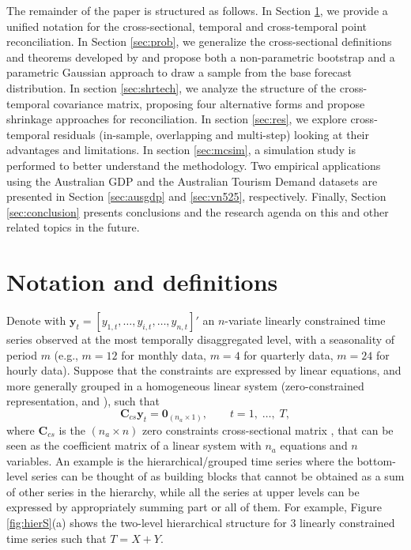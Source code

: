 \documentclass[a4paper,11pt]{article}
\newcommand{\yvet}{\bm{y}}
\newcommand{\Cvet}{\bm{C}}
\newcommand{\Zerovet}{\bm{0}}
\theoremstyle{definition}
\begin{document}
The remainder of the paper is structured as follows.
In Section \ref{sec:not}, we provide a unified notation for the cross-sectional, temporal and cross-temporal point reconciliation.
In Section \ref{sec:prob}, we generalize the cross-sectional definitions and theorems developed by \cite{panagiotelis2023} and propose both a non-parametric bootstrap and a parametric Gaussian approach to draw a sample from the base forecast distribution.
In section \ref{sec:shrtech}, we analyze the structure of the cross-temporal covariance matrix, proposing four alternative forms and propose shrinkage approaches for reconciliation.
In section \ref{sec:res}, we explore cross-temporal residuals (in-sample, overlapping and multi-step) looking at their advantages and limitations.
In section \ref{sec:mcsim}, a simulation study is performed to better understand the methodology.
Two empirical applications using the Australian GDP and the Australian Tourism Demand datasets are presented in Section \ref{sec:ausgdp} and \ref{sec:vn525}, respectively.
Finally, Section \ref{sec:conclusion} presents conclusions and the research agenda on this and other related topics in the future.

\section{Notation and definitions}\label{sec:not}


Denote with $\yvet_t = [y_{1,t},\dots,y_{i,t},\dots,y_{n,t}]'$ an $n$-variate linearly constrained time series observed at the most temporally disaggregated level, with a seasonality of period $m$ (e.g., $m = 12$ for monthly data, $m = 4$ for quarterly data, $m = 24$ for hourly data). Suppose that the constraints are expressed by linear equations, and more generally grouped in a homogeneous linear system (zero-constrained representation, \citealp{wickramasuriya2019} and  \citealp{difonzo2023}), such that
\begin{equation}
\label{eq:cs_con}
	\Cvet_{cs}\yvet_t = \Zerovet_{(n_a \times 1)}, \qquad t = 1, \;\dots, \;T,
\end{equation}
where $\Cvet_{cs}$ is the $(n_a \times n)$ zero constraints cross-sectional matrix , that can be seen as the coefficient matrix of a linear system with $n_a$ equations and $n$ variables. An example is the hierarchical/grouped time series where the bottom-level series can be thought of as building blocks that cannot be obtained as a sum of other series in the hierarchy, while all the series at upper levels can be expressed by appropriately summing part or all of them. For example, Figure \ref{fig:hierS}(a) shows the two-level hierarchical structure for 3 linearly constrained time series such that $T = X + Y$.
\end{document}

